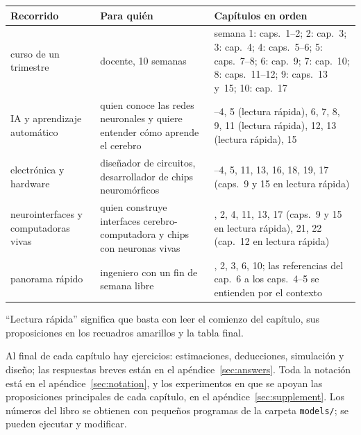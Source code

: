 \begin{center}
\footnotesize
\setlength{\tabcolsep}{4pt}
\renewcommand{\arraystretch}{1.2}
\begin{tabular}{>{\raggedright}p{3.0cm}>{\raggedright}p{3.9cm}>{\raggedright\arraybackslash}p{6.4cm}}
\toprule
Recorrido & Para quién & Capítulos en orden \\
\midrule
curso de un trimestre & docente, 10 semanas & semana 1: caps.~1--2; 2: cap.~3; 3: cap.~4; 4: caps.~5--6; 5: caps.~7--8; 6: cap.~9; 7: cap.~10; 8: caps.~11--12; 9: caps.~13 y~15; 10: cap.~17 \\
IA y aprendizaje automático & quien conoce las redes neuronales y quiere entender cómo aprende el cerebro & 1--4, 5 (lectura rápida), 6, 7, 8, 9, 11 (lectura rápida), 12, 13 (lectura rápida), 15 \\
electrónica y hardware & diseñador de circuitos, desarrollador de chips neuromórficos & 1--4, 5, 11, 13, 16, 18, 19, 17 (caps.~9 y 15 en lectura rápida) \\
neurointerfaces y computadoras vivas & quien construye interfaces cerebro-computadora y chips con neuronas vivas & 1, 2, 4, 11, 13, 17 (caps.~9 y 15 en lectura rápida), 21, 22 (cap.~12 en lectura rápida) \\
panorama rápido & ingeniero con un fin de semana libre & 1, 2, 3, 6, 10; las referencias del cap.~6 a los caps.~4--5 se entienden por el contexto \\
\bottomrule
\end{tabular}
\end{center}

“Lectura rápida” significa que basta con leer el comienzo del capítulo, sus proposiciones en los recuadros amarillos y la tabla final.

Al final de cada capítulo hay ejercicios: estimaciones, deducciones, simulación y diseño; las respuestas breves están en el apéndice~\ref{sec:answers}. Toda la notación está en el apéndice~\ref{sec:notation}, y los experimentos en que se apoyan las proposiciones principales de cada capítulo, en el apéndice~\ref{sec:supplement}. Los números del libro se obtienen con pequeños programas de la carpeta \texttt{models/}; se pueden ejecutar y modificar.
